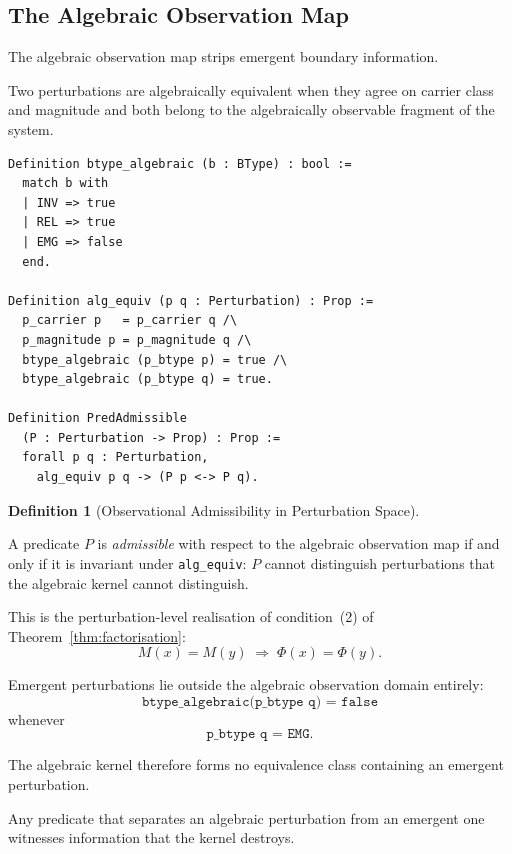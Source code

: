 \documentclass[12pt]{article}
\theoremstyle{plain}
\theoremstyle{definition}
\newtheorem{definition}[theorem]{Definition}
\theoremstyle{remark}
\begin{document}
\subsection{The Algebraic Observation Map}

The algebraic observation map strips emergent boundary information.

Two perturbations are algebraically equivalent when they agree on
carrier class and magnitude and both belong to the algebraically
observable fragment of the system.

\begin{lstlisting}[style=rocq,
caption={Algebraic equivalence and predicate admissibility.}]
Definition btype_algebraic (b : BType) : bool :=
  match b with
  | INV => true
  | REL => true
  | EMG => false
  end.

Definition alg_equiv (p q : Perturbation) : Prop :=
  p_carrier p   = p_carrier q /\
  p_magnitude p = p_magnitude q /\
  btype_algebraic (p_btype p) = true /\
  btype_algebraic (p_btype q) = true.

Definition PredAdmissible
  (P : Perturbation -> Prop) : Prop :=
  forall p q : Perturbation,
    alg_equiv p q -> (P p <-> P q).
\end{lstlisting}

\begin{definition}[Observational Admissibility in Perturbation Space]
\label{def:pred-admissible}

A predicate $P$ is \emph{admissible} with respect to the algebraic
observation map if and only if it is invariant under
\texttt{alg\_equiv}: $P$ cannot distinguish perturbations that the
algebraic kernel cannot distinguish.

This is the perturbation-level realisation of condition~(2) of
Theorem~\ref{thm:factorisation}:
\[
M(x) = M(y)
\;\Rightarrow\;
\Phi(x) = \Phi(y).
\]

\end{definition}

Emergent perturbations lie outside the algebraic observation domain
entirely:
\[
\texttt{btype\_algebraic(p\_btype q) = false}
\]
whenever
\[
\texttt{p\_btype q = EMG}.
\]

The algebraic kernel therefore forms no equivalence class containing
an emergent perturbation.

Any predicate that separates an algebraic perturbation from an
emergent one witnesses information that the kernel destroys.
\end{document}
